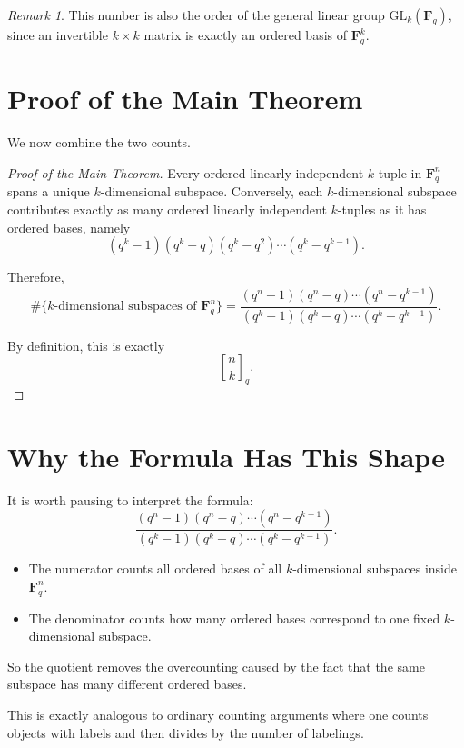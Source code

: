 \documentclass[11pt]{article}
\theoremstyle{definition}
\theoremstyle{remark}
\newtheorem{remark}[theorem]{Remark}
\newcommand{\F}{\mathbf{F}}
\newcommand{\GL}{\mathrm{GL}}
\newcommand{\qbinom}[2]{\genfrac{[}{]}{0pt}{}{#1}{#2}_q}
\begin{document}
	\begin{remark}
		This number is also the order of the general linear group \(\GL_k(\F_q)\), since an invertible \(k\times k\) matrix is exactly an ordered basis of \(\F_q^k\).
	\end{remark}
	
	\section{Proof of the Main Theorem}
	
	We now combine the two counts.
	
	\begin{proof}[Proof of the Main Theorem]
		Every ordered linearly independent \(k\)-tuple in \(\F_q^n\) spans a unique \(k\)-dimensional subspace. Conversely, each \(k\)-dimensional subspace contributes exactly as many ordered linearly independent \(k\)-tuples as it has ordered bases, namely
		\[
		(q^k-1)(q^k-q)(q^k-q^2)\cdots(q^k-q^{k-1}).
		\]
		
		Therefore,
		\[
		\#\{\text{\(k\)-dimensional subspaces of }\F_q^n\}
		=
		\frac{(q^n-1)(q^n-q)\cdots(q^n-q^{k-1})}
		{(q^k-1)(q^k-q)\cdots(q^k-q^{k-1})}.
		\]
		
		By definition, this is exactly
		\[
		\qbinom{n}{k}.
		\]
	\end{proof}
	
	\section{Why the Formula Has This Shape}
	
	It is worth pausing to interpret the formula:
	\[
	\frac{(q^n-1)(q^n-q)\cdots(q^n-q^{k-1})}
	{(q^k-1)(q^k-q)\cdots(q^k-q^{k-1})}.
	\]
	
	\begin{itemize}
		\item The numerator counts all ordered bases of all \(k\)-dimensional subspaces inside \(\F_q^n\).
		\item The denominator counts how many ordered bases correspond to one fixed \(k\)-dimensional subspace.
	\end{itemize}
	
	So the quotient removes the overcounting caused by the fact that the same subspace has many different ordered bases.
	
	This is exactly analogous to ordinary counting arguments where one counts objects with labels and then divides by the number of labelings.
	
\end{document}
